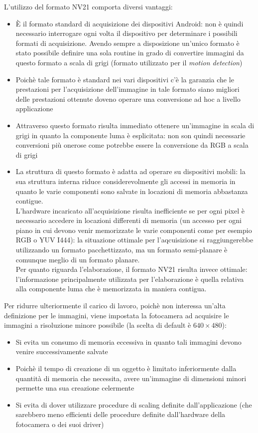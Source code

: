 L'utilizzo del formato NV21 comporta diversi vantaggi:
\begin{itemize}
  \item \`E il formato standard di acquisizione dei dispositivi Android: non è quindi necessario interrogare ogni volta il dispositivo per determinare i possibili formati di acquisizione. Avendo sempre a disposizione un'unico formato è stato possibile definire una sola routine in grado di convertire immagini da questo formato a scala di grigi (formato utilizzato per il \textit{motion detection})
  \item Poichè tale formato è standard nei vari dispositivi c'è la garanzia che le prestazioni per l'acquisizione dell'immagine in tale formato siano migliori delle prestazioni ottenute doveno operare una conversione ad hoc a livello applicazione
  \item Attraverso questo formato risulta immediato ottenere un'immagine in scala di grigi in quanto la componente luma è esplicitata: non son quindi necessarie conversioni più onerose come potrebbe essere la conversione da RGB a scala di grigi
  \item La struttura di questo formato è adatta ad operare su dispositivi mobili: la sua struttura interna riduce considerevolmente gli accessi in memoria in quanto le varie componenti sono salvate in locazioni di memoria abbastanza contigue.\\
  L'hardware incaricato all'acquisizione risulta inefficiente se per ogni pixel è necessario accedere in locazioni differenti di memoria (un accesso per ogni piano in cui devono venir memorizzate le varie componenti come per esempio RGB o YUV I444): la situazione ottimale per l'aqcuisizione si raggiungerebbe utilizzando un formato pacchettizzato, ma un formato semi-planare è comunque meglio di un formato planare.\\
  Per quanto riguarda l'elaborazione, il formato NV21 risulta invece ottimale: l'informazione principalmente utilizzata per l'elaborazione è quella relativa alla componente luma che è memorizzata in maniera contigua.
\end{itemize}

Per ridurre ulteriormente il carico di lavoro, poichè non interessa un'alta definizione per le immagini, viene impostata la fotocamera ad acquisire le immagini a risoluzione minore possibile (la scelta di default è $640×480$):
\begin{itemize}
  \item Si evita un consumo di memoria eccessiva in quanto tali immagini devono venire successivamente salvate
  \item Poichè il tempo di creazione di un oggetto è limitato inferiormente dalla quantità di memoria che necessita, avere un'immagine di dimensioni minori permette una sua creazione celermente
  \item Si evita di dover utilizzare procedure di scaling definite dall'applicazione (che sarebbero meno efficienti delle procedure definite dall'hardware della fotocamera o dei suoi driver)
\end{itemize}


